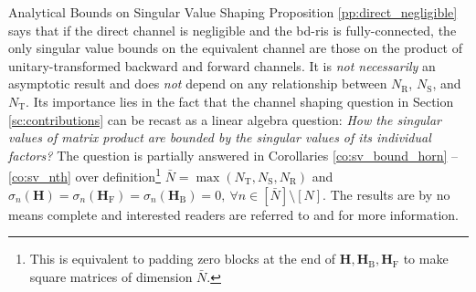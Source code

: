 \documentclass[journal]{IEEEtran}
\begin{document}
\begin{section}{Analytical Bounds on Singular Value Shaping}
		Proposition \ref{pp:direct_negligible} says that if the direct channel is negligible and the \gls{bd}-\gls{ris} is fully-connected, the only singular value bounds on the equivalent channel are those on the product of unitary-transformed backward and forward channels.
		It is \emph{not necessarily} an asymptotic result and does \emph{not} depend on any relationship between $N_\mathrm{R}$, $N_\mathrm{S}$, and $N_\mathrm{T}$.
		Its importance lies in the fact that the channel shaping question in Section \ref{sc:contributions} can be recast as a linear algebra question: \emph{How the singular values of matrix product are bounded by the singular values of its individual factors?}
		The question is partially answered in Corollaries \ref{co:sv_bound_horn} -- \ref{co:sv_nth} over definition\footnote{This is equivalent to padding zero blocks at the end of $\mathbf{H}, \mathbf{H}_\mathrm{B}, \mathbf{H}_\mathrm{F}$ to make square matrices of dimension $\bar{N}$.} $\bar{N} = \max(N_\mathrm{T},N_\mathrm{S},N_\mathrm{R})$ and $\sigma_n(\mathbf{H})=\sigma_n(\mathbf{H}_\mathrm{F})=\sigma_n(\mathbf{H}_\mathrm{B})=0, \ \forall n \in [\bar{N}] \setminus [N]$.
		The results are by no means complete and interested readers are referred to \cite[Chapter 16, 24]{Hogben2013} and \cite[Chapter 3]{Horn1994} for more information.



\end{section}
\end{document}
